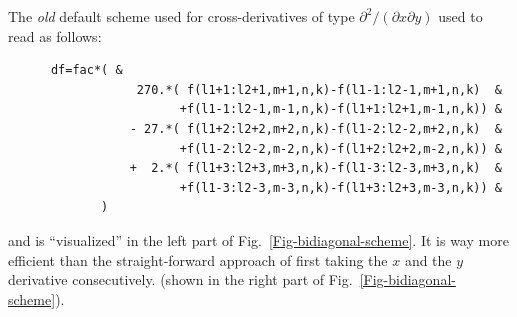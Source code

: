 \documentclass[\mydriver,12pt,twoside,notitlepage,a4paper]{article}
\begin{document}
The {\em old} default scheme used for cross-derivatives of type
$\partial^2/(\partial x \partial y)$ used to read as follows:
\begin{verbatim}
      df=fac*( &
                  270.*( f(l1+1:l2+1,m+1,n,k)-f(l1-1:l2-1,m+1,n,k)  &
                        +f(l1-1:l2-1,m-1,n,k)-f(l1+1:l2+1,m-1,n,k)) &
                 - 27.*( f(l1+2:l2+2,m+2,n,k)-f(l1-2:l2-2,m+2,n,k)  &
                        +f(l1-2:l2-2,m-2,n,k)-f(l1+2:l2+2,m-2,n,k)) &
                 +  2.*( f(l1+3:l2+3,m+3,n,k)-f(l1-3:l2-3,m+3,n,k)  &
                        +f(l1-3:l2-3,m-3,n,k)-f(l1+3:l2+3,m-3,n,k)) &
             )
\end{verbatim}
and is ``visualized'' in the left part of Fig.~\ref{Fig-bidiagonal-scheme}.
It is way more efficient than the straight-forward approach of first
taking the $x$ and the $y$ derivative consecutively.
(shown in the right part of Fig.~\ref{Fig-bidiagonal-scheme}).
\end{document}
